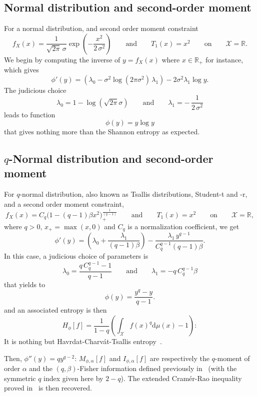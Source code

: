 \documentclass[english,sort&compress]{elsarticle}
\theoremstyle{definition}
\theoremstyle{plain}
\theoremstyle{plain}
\def\dmu{\mathrm{d}\mu}
\def\Rset{\mathbb{R}}
\def\X{\mathcal{X}}
\begin{document}

\subsection{Normal distribution and second-order moment}
\label{subsec:NormalSecondOrder}

For a normal distribution, and second order moment constraint 
%
\[
f_X(x)  = \frac{1}{\sqrt{2\pi} \,\sigma}  \exp\left( -\frac{x^2}{2  \, \sigma^2}
\right)  \qquad \mbox{and}  \qquad T_1(x)  = x^2  \qquad \mbox{on}  \qquad  \X =
\Rset.
\]
%
We begin  by computing the  inverse of  $y = f_X(x)$  where $x \in  \Rset_+$ for
instance, which gives
%
\[
\phi'(y) = \left( \lambda_0 - \sigma^2 \log(2 \pi \sigma^2) \, \lambda_1 \right)
- 2 \sigma^2 \lambda_1 \log y.
\]
%
The judicious choice
%
\[
\lambda_0 = 1 - \log( \sqrt{2\pi}  \sigma ) \qquad \mbox{and} \qquad \lambda_1 =
- \, \frac{1}{2 \, \sigma^2}
\]
%
leads to function
%
\[
\phi(y) = y \log y
\]
%
that gives nothing more than the Shannon entropy as expected.



\subsection{$q$-Normal distribution and second-order moment}
\label{subsec:qNormalSecondOrder}

For $q$-normal distribution, also  known as Tsallis distributions, Student-t and
-r, and a second order moment constraint,
%
\[
f_X(x)  = C_q  \Big( 1  - (q-1)  \beta x^2  \Big)_{\!+}^{\frac{1}{(q-1)}} \qquad
\mbox{and} \qquad T_1(x) = x^2 \qquad \mbox{on} \qquad \X = \Rset,
\]
%
where $q  > 0$, $x_+ = \max(x,0)$  and $C_q$ is a  normalization coefficient, we
get
%
\[
\phi'(y)  =   \left(  \lambda_0   +  \frac{\lambda_1}{(q-1)  \beta}   \right)  -
\frac{\lambda_1 \, y^{q-1}}{C_q^{q-1} (q-1) \beta}.
\]
%
In this case, a judicious choice of parameters is
%
\[
\lambda_0 = \frac{q \, C_q^{q-1}  - 1}{q-1} \qquad \mbox{and} \qquad \lambda_1 =
-q \, C_q^{q-1} \beta
\]
%
that yields to 
%
\[
\phi(y) = \frac{y^q-y}{q-1}.
\]
%
and an associated entropy is then 
%
\[
H_\phi[f] = \frac{1}{1-q} \left( \int_\X f(x)^q \dmu(x) - 1 \right):
\]
%
It  is  nothing  but  Havrdat-Charv\'at-Tsallis  entropy~\cite{HavCha67,  Dar70,
  Tsa88, CosHer03}.

Then, $\phi''(y) = q y^{q-2}$: $M_{\phi,\alpha}[f]$ and $I_{\phi,\alpha}[f]$ are
respectively  the  $q$-moment  of  order  $\alpha$  and  the  $(q,\beta)$-Fisher
information defined previously in~\cite{Ber12:06_1, Ber12:06_2, Ber13} (with the
symmetric $q$ index  given here by $2-q$). The  extended Cram\'er-Rao inequality
proved in~\cite{Ber12:06_2, Ber13} is then recovered.
\end{document}
